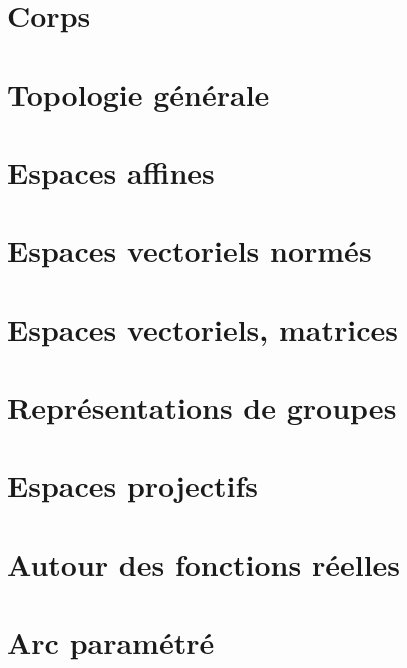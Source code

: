 \chapter{Corps}





\chapter{Topologie générale}



\chapter{Espaces affines}


\chapter{Espaces vectoriels normés}



\chapter{Espaces vectoriels, matrices}






\chapter{Représentations de groupes}


\chapter{Espaces projectifs}


\chapter{Autour des fonctions réelles}





\chapter{Arc paramétré}


